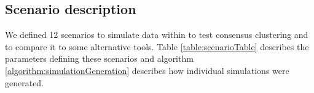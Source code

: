 \documentclass[]{article}
\begin{document}
\subsection{Scenario description}
We defined 12 scenarios to simulate data within to test consensus clustering and to compare it to some alternative tools. Table \ref{table:scenarioTable} describes the parameters defining these scenarios and algorithm \ref{algorithm:simulationGeneration} describes how individual simulations were generated.
\end{document}

